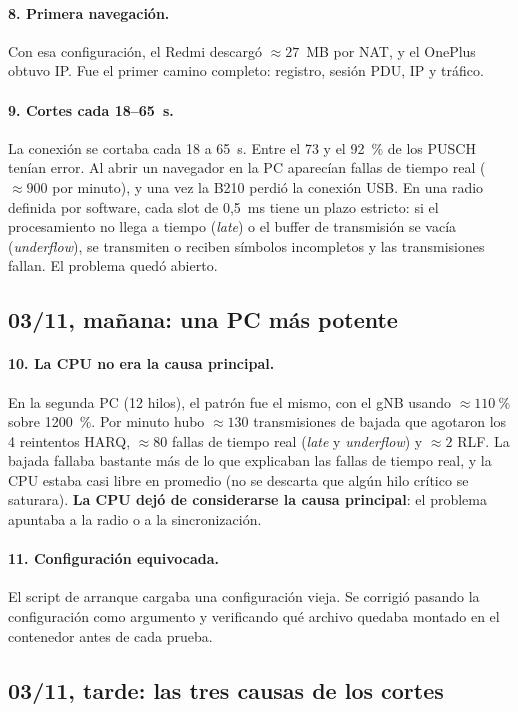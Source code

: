 \paragraph{8. Primera navegación.} Con esa configuración, el Redmi descargó $\approx 27$~MB por NAT, y el OnePlus obtuvo IP. Fue el primer camino completo: registro, sesión PDU, IP y tráfico.

\paragraph{9. Cortes cada 18--65~s.} La conexión se cortaba cada 18 a 65~s. Entre el 73 y el 92~\% de los PUSCH tenían error. Al abrir un navegador en la PC aparecían fallas de tiempo real ($\approx 900$ por minuto), y una vez la B210 perdió la conexión USB. En una radio definida por software, cada slot de 0,5~ms tiene un plazo estricto: si el procesamiento no llega a tiempo (\emph{late}) o el buffer de transmisión se vacía (\emph{underflow}), se transmiten o reciben símbolos incompletos y las transmisiones fallan. El problema quedó abierto.

\subsection{03/11, mañana: una PC más potente}
\paragraph{10. La CPU no era la causa principal.} En la segunda PC (12 hilos), el patrón fue el mismo, con el gNB usando $\approx 110~\%$ sobre 1200~\%. Por minuto hubo $\approx 130$ transmisiones de bajada que agotaron los 4 reintentos HARQ, $\approx 80$ fallas de tiempo real (\emph{late} y \emph{underflow}) y $\approx 2$ RLF. La bajada fallaba bastante más de lo que explicaban las fallas de tiempo real, y la CPU estaba casi libre en promedio (no se descarta que algún hilo crítico se saturara). \textbf{La CPU dejó de considerarse la causa principal}: el problema apuntaba a la radio o a la sincronización.

\paragraph{11. Configuración equivocada.} El script de arranque cargaba una configuración vieja. Se corrigió pasando la configuración como argumento y verificando qué archivo quedaba montado en el contenedor antes de cada prueba.

\subsection{03/11, tarde: las tres causas de los cortes}
